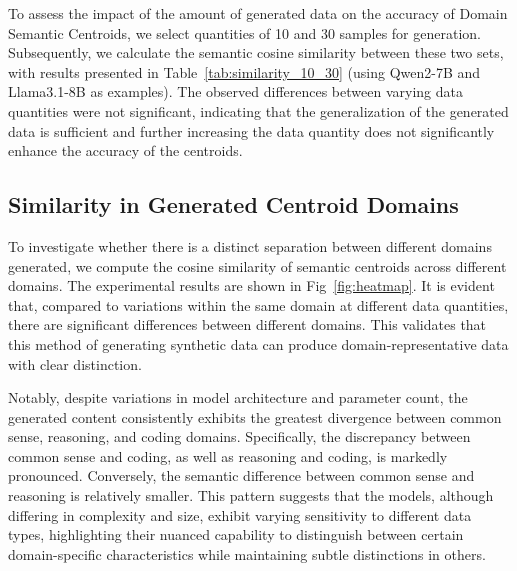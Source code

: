 To assess the impact of the amount of generated data on the accuracy of Domain Semantic Centroids, we select quantities of 10 and 30 samples for generation. Subsequently, we calculate the semantic cosine similarity between these two sets, with results presented in Table~\ref{tab:similarity_10_30} (using Qwen2-7B and Llama3.1-8B as examples). The observed differences between varying data quantities were not significant, indicating that the generalization of the generated data is sufficient and further increasing the data quantity does not significantly enhance the accuracy of the centroids.
\begin{table}[h]
\centering
\caption{Semantic cosine similarity between generated samples of size 10 and 30 across different domains.}
\label{tab:similarity_10_30}
\label{tab:similarity}
\end{table}

\subsection{Similarity in Generated Centroid Domains}
\label{sec:appendix-centroids-domain}

To investigate whether there is a distinct separation between different domains generated, we compute the cosine similarity of semantic centroids across different domains. The experimental results are shown in Fig~\ref{fig:heatmap}. It is evident that, compared to variations within the same domain at different data quantities, there are significant differences between different domains. This validates that this method of generating synthetic data can produce domain-representative data with clear distinction.

Notably, despite variations in model architecture and parameter count, the generated content consistently exhibits the greatest divergence between common sense, reasoning, and coding domains. Specifically, the discrepancy between common sense and coding, as well as reasoning and coding, is markedly pronounced. Conversely, the semantic difference between common sense and reasoning is relatively smaller. This pattern suggests that the models, although differing in complexity and size, exhibit varying sensitivity to different data types, highlighting their nuanced capability to distinguish between certain domain-specific characteristics while maintaining subtle distinctions in others.

